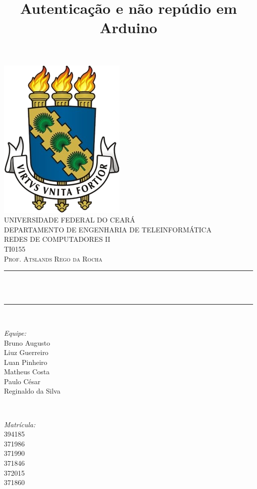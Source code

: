 \documentclass[a4paper]{article}
\title{Autenticação e não repúdio em Arduino} %
\makeatletter
\let\thetitle\@title
\makeatother
\begin{document}
    \begin{titlepage}
    \centering
    \vspace*{0.5 cm}
        \includegraphics[scale = 0.6]{logo_ufc.png}\\[1.0 cm] %
        \textsc{\Large UNIVERSIDADE FEDERAL DO CEARÁ}\\[0.5 cm] %
        \textsc{DEPARTAMENTO DE ENGENHARIA DE TELEINFORMÁTICA}\\[1.5 cm]
        \textsc{REDES DE COMPUTADORES II\\ \normalsize TI0155}\\[1.0 cm]  
      \textsc{Prof. Atslands Rego da Rocha}\\[0.5 cm] %
      \rule{\linewidth}{0.2 mm} \\[0.4 cm]
    { \huge \bfseries \thetitle}\\
    \rule{\linewidth}{0.2 mm} \\[0.5 cm]
    \begin{minipage}{0.4\textwidth}
    \begin{flushleft} \large
    \emph{Equipe:}\\
    \textnormal{Bruno Augusto\\Liuz Guerreiro\\Luan Pinheiro\\Matheus Costa\\Paulo César\\Reginaldo da Silva}
    \end{flushleft}
    \end{minipage}~
    \begin{minipage}{0.4\textwidth}
    \begin{flushright} \large
    \emph{Matrícula:} \\
          394185\\371986\\371990\\371846\\372015\\371860                 %
          \end{flushright}
          \end{minipage}\\[2 cm]
          

\end{titlepage}
\end{document}
